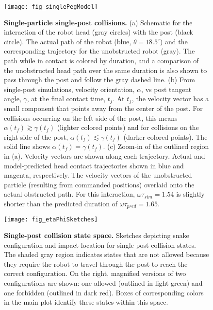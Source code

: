 \documentclass[aps,pre,twocolumn,superscriptaddress]{revtex4-1}
\begin{document}
\begin{figure}[ht!]
	\texttt{[image: fig\_singlePegModel]}
	\caption{\textbf{Single-particle single-post collisions.} (a) Schematic for the interaction of the robot head (gray circles) with the post (black circle). The actual path of the robot (blue, $\theta = 18.5^{\circ}$) and the corresponding trajectory for the unobstructed robot (gray). The path while in contact is colored by duration, and a comparison of the unobstructed head path over the same duration is also shown to pass through the post and follow the gray dashed line. (b) From single-post simulations, velocity orientation, $\alpha$, vs post tangent angle, $\gamma$, at the final contact time, $t_f$. At $t_f$, the velocity vector has a small component that points away from the center of the post. For collisions occurring on the left side of the post, this means $\alpha(t_f) \gtrsim \gamma(t_f)$ (lighter colored points) and for collisions on the right side of the post, $\alpha(t_f) \lesssim \gamma(t_f)$ (darker colored points). The solid line shows $\alpha(t_f) = \gamma(t_f)$. (c) Zoom-in of the outlined region in (a). Velocity vectors are shown along each trajectory. Actual and model-predicted head contact trajectories shown in blue and magenta, respectively. The velocity vectors of the unobstructed particle (resulting from commanded positions) overlaid onto the actual obstructed path.  For this interaction, $\omega \tau_{sim} = 1.54$ is slightly shorter than the predicted duration of $\omega \tau_{pred} = 1.65$. }
	\label{fig:singlepost}
\end{figure}

\begin{figure*}[h!]
	\texttt{[image: fig\_etaPhiSketches]}
	\caption{\textbf{Single-post collision state space.} Sketches depicting snake configuration and impact location for single-post collision states. The shaded gray region indicates states that are not allowed because they require the robot to travel through the post to reach the correct configuration. On the right, magnified versions of two configurations are shown: one allowed (outlined in light green) and one forbidden (outlined in dark red). Boxes of corresponding colors in the main plot identify these states within this space.}
	\label{fig:sketches}
\end{figure*}
\end{document}
